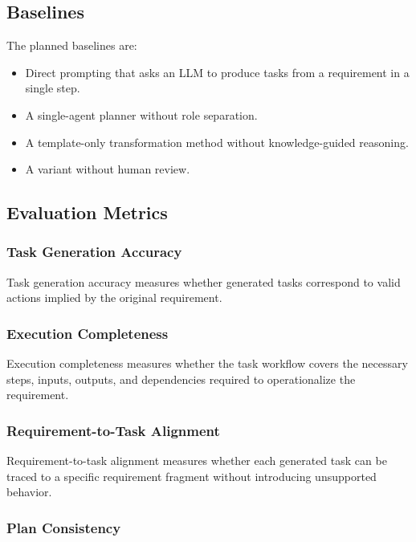 \subsection{Baselines}
\label{sec:exp-baselines}

The planned baselines are:
\begin{itemize}[leftmargin=*]
  \item Direct prompting that asks an LLM to produce tasks from a requirement in a single step.
  \item A single-agent planner without role separation.
  \item A template-only transformation method without knowledge-guided reasoning.
  \item A variant without human review.
\end{itemize}

\subsection{Evaluation Metrics}
\label{sec:exp-metrics}

\subsubsection{Task Generation Accuracy}
\label{sec:metric-accuracy}

Task generation accuracy measures whether generated tasks correspond to valid actions implied by the original requirement.

\subsubsection{Execution Completeness}
\label{sec:metric-completeness}

Execution completeness measures whether the task workflow covers the necessary steps, inputs, outputs, and dependencies required to operationalize the requirement.

\subsubsection{Requirement-to-Task Alignment}
\label{sec:metric-alignment}

Requirement-to-task alignment measures whether each generated task can be traced to a specific requirement fragment without introducing unsupported behavior.

\subsubsection{Plan Consistency}
\label{sec:metric-consistency}

